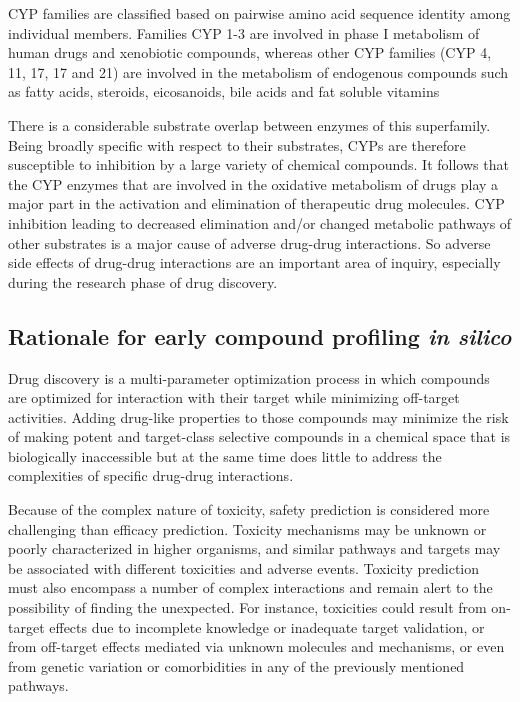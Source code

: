 CYP families are classified based on pairwise amino acid sequence identity among individual members. Families CYP 1-3 are involved in phase I metabolism of human drugs and xenobiotic compounds, whereas other CYP families (CYP 4, 11, 17, 17 and 21) are involved in the metabolism of endogenous compounds such as fatty acids, steroids, eicosanoids, bile acids and fat soluble vitamins\cite{Singh2011}

There is a considerable substrate overlap between enzymes of this superfamily. Being broadly specific with respect to their substrates, CYPs are therefore susceptible to inhibition by a large variety of chemical compounds. It follows that the CYP enzymes that are involved in the oxidative metabolism of drugs play a major part in the activation and elimination of therapeutic drug molecules. CYP inhibition leading to decreased elimination and/or changed metabolic pathways of other substrates is a major cause of adverse drug-drug interactions. \cite{Lapins2013} So adverse side effects of drug-drug interactions are an important area of inquiry, especially during the research phase of drug discovery.


\subsection{Rationale for early compound profiling \textit{in silico}}

Drug discovery is a multi-parameter optimization process in which compounds are optimized for interaction with their target while minimizing off-target activities. \cite{Zlokarnik2005} Adding drug-like properties to those compounds may minimize the risk of making potent and target-class selective compounds in a chemical space that is biologically inaccessible but at the same time does little to address the complexities of specific drug-drug interactions.


Because of the complex nature of toxicity, safety prediction is considered more challenging than efficacy prediction. Toxicity mechanisms may be unknown or poorly characterized in higher organisms, and similar pathways and targets may be associated with different toxicities and adverse events. Toxicity prediction must also encompass a number of complex interactions and remain alert to the possibility of finding the unexpected. For instance, toxicities could result from on-target effects due to incomplete knowledge or inadequate target validation, or from off-target effects mediated via unknown molecules and mechanisms, or even from genetic variation or comorbidities in any of the previously mentioned pathways. \cite{Kruhlak2012}

